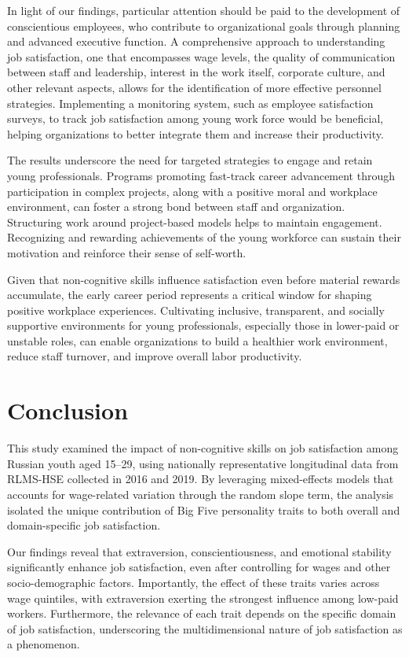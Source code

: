 \documentclass[
]{interact}
\begin{document}
In light of our findings, particular attention should be paid to the
development of conscientious employees, who contribute to organizational
goals through planning and advanced executive function. A comprehensive
approach to understanding job satisfaction, one that encompasses wage
levels, the quality of communication between staff and leadership,
interest in the work itself, corporate culture, and other relevant
aspects, allows for the identification of more effective personnel
strategies. Implementing a monitoring system, such as employee
satisfaction surveys, to track job satisfaction among young work force
would be beneficial, helping organizations to better integrate them and
increase their productivity.

The results underscore the need for targeted strategies to engage and
retain young professionals. Programs promoting fast-track career
advancement through participation in complex projects, along with a
positive moral and workplace environment, can foster a strong bond
between staff and organization. Structuring work around project-based
models helps to maintain engagement. Recognizing and rewarding
achievements of the young workforce can sustain their motivation and
reinforce their sense of self-worth.

Given that non-cognitive skills influence satisfaction even before
material rewards accumulate, the early career period represents a
critical window for shaping positive workplace experiences. Cultivating
inclusive, transparent, and socially supportive environments for young
professionals, especially those in lower-paid or unstable roles, can
enable organizations to build a healthier work environment, reduce staff
turnover, and improve overall labor productivity.

\section{Conclusion}\label{conclusion}

This study examined the impact of non-cognitive skills on job
satisfaction among Russian youth aged 15--29, using nationally
representative longitudinal data from RLMS-HSE collected in 2016 and
2019. By leveraging mixed-effects models that accounts for wage-related
variation through the random slope term, the analysis isolated the
unique contribution of Big Five personality traits to both overall and
domain-specific job satisfaction.

Our findings reveal that extraversion, conscientiousness, and emotional
stability significantly enhance job satisfaction, even after controlling
for wages and other socio-demographic factors. Importantly, the effect
of these traits varies across wage quintiles, with extraversion exerting
the strongest influence among low-paid workers. Furthermore, the
relevance of each trait depends on the specific domain of job
satisfaction, underscoring the multidimensional nature of job
satisfaction as a phenomenon.
\end{document}
